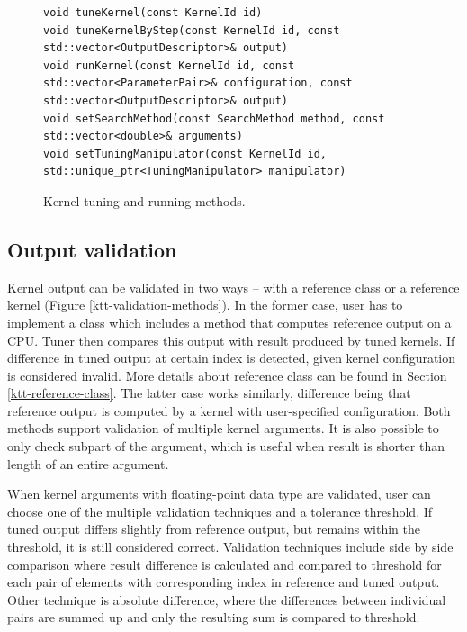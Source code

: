\documentclass
[
    digital, %
    oneside, %
    table, %
    nolof, %
    nolot, %
    nocover %
]{fithesis3}
\begin{document}
\begin{figure}
\begin{adjustwidth}{-1cm}{-1cm}
\begin{lstlisting}
void tuneKernel(const KernelId id)
void tuneKernelByStep(const KernelId id, const std::vector<OutputDescriptor>& output)
void runKernel(const KernelId id, const std::vector<ParameterPair>& configuration, const std::vector<OutputDescriptor>& output)
void setSearchMethod(const SearchMethod method, const std::vector<double>& arguments)
void setTuningManipulator(const KernelId id, std::unique_ptr<TuningManipulator> manipulator)
\end{lstlisting}
\caption{Kernel tuning and running methods.}
\label{ktt-tuning-methods}
\end{adjustwidth}
\end{figure}

\subsection{Output validation}
\label{ktt-validation}
Kernel output can be validated in two ways -- with a reference class or a reference kernel (Figure \ref{ktt-validation-methods}). In the former case,
user has to implement a class which includes a method that computes reference output on a CPU. Tuner then compares this output with result produced
by tuned kernels. If difference in tuned output at certain index is detected, given kernel configuration is considered invalid. More details about
reference class can be found in Section \ref{ktt-reference-class}. The latter case works similarly, difference being that reference output is computed
by a kernel with user-specified configuration. Both methods support validation of multiple kernel arguments. It is also possible to only check subpart
of the argument, which is useful when result is shorter than length of an entire argument.

When kernel arguments with floating-point data type are validated, user can choose one of the multiple validation techniques and a tolerance threshold.
If tuned output differs slightly from reference output, but remains within the threshold, it is still considered correct. Validation techniques include
side by side comparison where result difference is calculated and compared to threshold for each pair of elements with corresponding index in reference
and tuned output. Other technique is absolute difference, where the differences between individual pairs are summed up and only the resulting sum is
compared to threshold.
\end{document}
